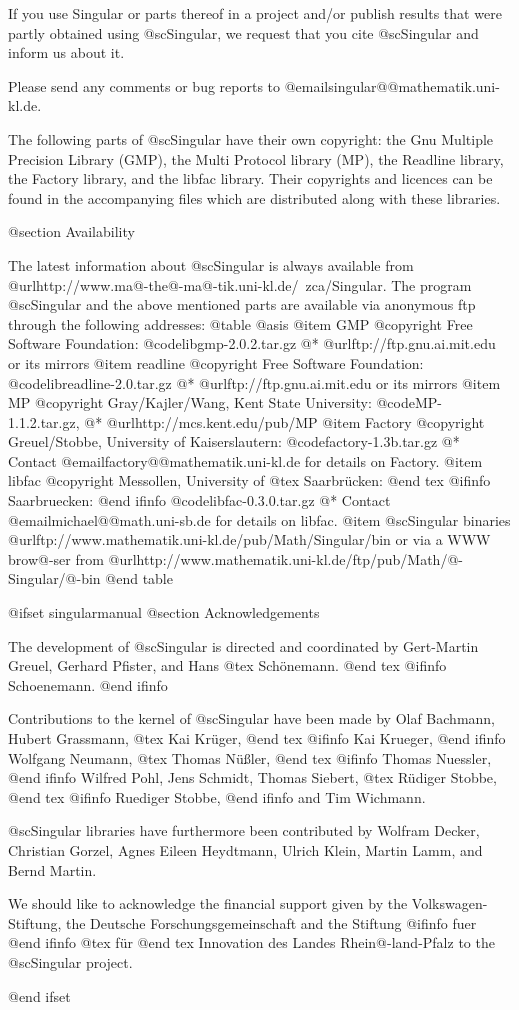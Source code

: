 If you use Singular or parts thereof in a project and/or publish
results that were partly obtained using @sc{Singular}, we request that you
cite @sc{Singular} and inform us about it.

Please send any comments or bug reports to
@email{singular@@mathematik.uni-kl.de}.

The following parts of @sc{Singular} have their own copyright: the Gnu Multiple
Precision Library (GMP), the Multi Protocol library (MP), the Readline library,
the Factory library, and the libfac library.
Their copyrights and licences can be found in the accompanying files
which are distributed along with these libraries.

@section Availability

The latest information about @sc{Singular} is always available from
@url{http://www.ma@-the@-ma@-tik.uni-kl.de/~zca/Singular}.
The program @sc{Singular} and the above mentioned parts are available via
anonymous ftp through the following addresses:
@table @asis
@item GMP
@copyright{} Free Software Foundation:
@code{libgmp-2.0.2.tar.gz}
@* @url{ftp://ftp.gnu.ai.mit.edu} or its mirrors
@item readline
@copyright{} Free Software Foundation:
@code{libreadline-2.0.tar.gz}
@* @url{ftp://ftp.gnu.ai.mit.edu} or its mirrors
@item MP
@copyright{} Gray/Kajler/Wang, Kent State University:
@code{MP-1.1.2.tar.gz},
@* @url{http://mcs.kent.edu/pub/MP}
@item Factory
@copyright{} Greuel/Stobbe, University of Kaiserslautern:
@code{factory-1.3b.tar.gz}
@* Contact @email{factory@@mathematik.uni-kl.de} for details on Factory.
@item libfac
@copyright{}  Messollen, University of 
@tex
Saarbr\"ucken:
@end tex
@ifinfo
Saarbruecken:
@end ifinfo
@code{libfac-0.3.0.tar.gz}
@* Contact @email{michael@@math.uni-sb.de} for details on libfac.
@item @sc{Singular} binaries
@url{ftp://www.mathematik.uni-kl.de/pub/Math/Singular/bin} or via a
WWW brow@-ser from
@url{http://www.mathematik.uni-kl.de/ftp/pub/Math/@-Singular/@-bin}
@end table

@ifset singularmanual
@section Acknowledgements

The development of @sc{Singular} is directed and coordinated by
Gert-Martin Greuel, Gerhard Pfister, and Hans
@tex
Sch\"onemann.
@end tex
@ifinfo
Schoenemann.
@end ifinfo

Contributions to the kernel of @sc{Singular} have been made by
Olaf Bachmann,
Hubert Grassmann,
@tex
Kai Kr\"uger,
@end tex
@ifinfo
Kai Krueger,
@end ifinfo
Wolfgang Neumann,
@tex
Thomas N\"u{\ss}ler,
@end tex
@ifinfo
Thomas Nuessler,
@end ifinfo
Wilfred Pohl,
Jens Schmidt,
Thomas Siebert,
@tex
R\"udiger Stobbe,
@end tex
@ifinfo
Ruediger Stobbe,
@end ifinfo
and
Tim Wichmann.

@sc{Singular} libraries have furthermore been contributed by 
Wolfram Decker,
Christian Gorzel,
Agnes Eileen Heydtmann,
Ulrich Klein,
Martin Lamm,
and
Bernd Martin.

We should like to acknowledge the financial support given by
the Volkswagen-Stiftung,
the Deutsche Forschungsgemeinschaft
and the Stiftung
@ifinfo
fuer
@end ifinfo
@tex
f\"ur
@end tex
Innovation des Landes Rhein@-land-Pfalz
to the
@sc{Singular} project.

@end ifset

